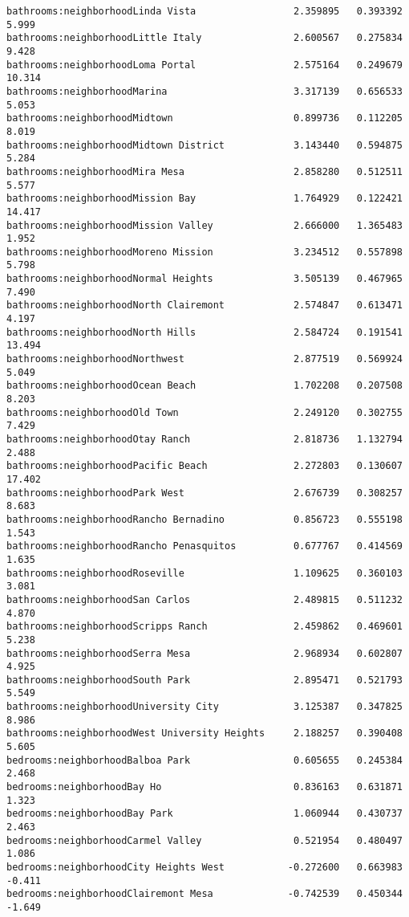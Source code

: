 \documentclass[
  letterpaper,
  krantz2]{style/krantz}
\begin{document}
\begin{verbatim}
bathrooms:neighborhoodLinda Vista                 2.359895   0.393392   5.999
bathrooms:neighborhoodLittle Italy                2.600567   0.275834   9.428
bathrooms:neighborhoodLoma Portal                 2.575164   0.249679  10.314
bathrooms:neighborhoodMarina                      3.317139   0.656533   5.053
bathrooms:neighborhoodMidtown                     0.899736   0.112205   8.019
bathrooms:neighborhoodMidtown District            3.143440   0.594875   5.284
bathrooms:neighborhoodMira Mesa                   2.858280   0.512511   5.577
bathrooms:neighborhoodMission Bay                 1.764929   0.122421  14.417
bathrooms:neighborhoodMission Valley              2.666000   1.365483   1.952
bathrooms:neighborhoodMoreno Mission              3.234512   0.557898   5.798
bathrooms:neighborhoodNormal Heights              3.505139   0.467965   7.490
bathrooms:neighborhoodNorth Clairemont            2.574847   0.613471   4.197
bathrooms:neighborhoodNorth Hills                 2.584724   0.191541  13.494
bathrooms:neighborhoodNorthwest                   2.877519   0.569924   5.049
bathrooms:neighborhoodOcean Beach                 1.702208   0.207508   8.203
bathrooms:neighborhoodOld Town                    2.249120   0.302755   7.429
bathrooms:neighborhoodOtay Ranch                  2.818736   1.132794   2.488
bathrooms:neighborhoodPacific Beach               2.272803   0.130607  17.402
bathrooms:neighborhoodPark West                   2.676739   0.308257   8.683
bathrooms:neighborhoodRancho Bernadino            0.856723   0.555198   1.543
bathrooms:neighborhoodRancho Penasquitos          0.677767   0.414569   1.635
bathrooms:neighborhoodRoseville                   1.109625   0.360103   3.081
bathrooms:neighborhoodSan Carlos                  2.489815   0.511232   4.870
bathrooms:neighborhoodScripps Ranch               2.459862   0.469601   5.238
bathrooms:neighborhoodSerra Mesa                  2.968934   0.602807   4.925
bathrooms:neighborhoodSouth Park                  2.895471   0.521793   5.549
bathrooms:neighborhoodUniversity City             3.125387   0.347825   8.986
bathrooms:neighborhoodWest University Heights     2.188257   0.390408   5.605
bedrooms:neighborhoodBalboa Park                  0.605655   0.245384   2.468
bedrooms:neighborhoodBay Ho                       0.836163   0.631871   1.323
bedrooms:neighborhoodBay Park                     1.060944   0.430737   2.463
bedrooms:neighborhoodCarmel Valley                0.521954   0.480497   1.086
bedrooms:neighborhoodCity Heights West           -0.272600   0.663983  -0.411
bedrooms:neighborhoodClairemont Mesa             -0.742539   0.450344  -1.649

\end{verbatim}
\end{document}
